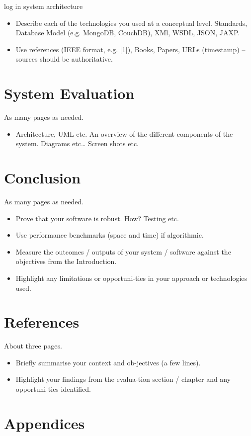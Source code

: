  
 
 log in system architecture 
 
 
 
 
 
\begin{itemize}
\item Describe each of the technologies you used at a conceptual level. Standards, Database Model (e.g. MongoDB, CouchDB), XMl, WSDL, JSON, JAXP.
\item Use references (IEEE format, e.g. [1]), Books, Papers, URLs (timestamp) – sources should be authoritative. 
\end{itemize}


\chapter{System Evaluation}
As many pages as needed.




\begin{itemize}
\item Architecture, UML etc. An overview of the different components of the system. Diagrams etc… Screen shots etc.






\end{itemize}


\chapter{Conclusion}
As many pages as needed.
\begin{itemize}
\item Prove that your software is robust. How? Testing etc. 
\item Use performance benchmarks (space and time) if algorithmic.
\item Measure the outcomes / outputs of your system / software against the objectives from the Introduction.
\item Highlight any limitations or opportuni-ties in your approach or technologies used.
\end{itemize}

\chapter{References}
About three pages.

\begin{itemize}
\item Briefly summarise your context and ob-jectives (a few lines).
\item Highlight your findings from the evalua-tion section / chapter and any opportuni-ties identified.
\end{itemize}

\chapter{Appendices }


